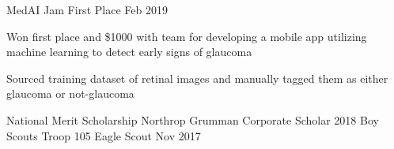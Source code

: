 
\begin{cventries}
  \cventry
    {MedAI Jam} %
    {First Place} %
    {} %
    {Feb 2019} %
    {
      \begin{cvitems}
        \item {Won first place and \$1000 with team for developing a mobile app utilizing machine learning to detect early signs of glaucoma}
        \item {Sourced training dataset of retinal images and manually tagged them as either glaucoma or not-glaucoma}
      \end{cvitems}
    } %

  \cventry
    {National Merit Scholarship}
    {Northrop Grumman Corporate Scholar}
    {}
    {2018}
    {}  
  \vspace{-1.5mm}
  \cventry
    {Boy Scouts Troop 105}
    {Eagle Scout}
    {}
    {Nov 2017}
    {}

\end{cventries}